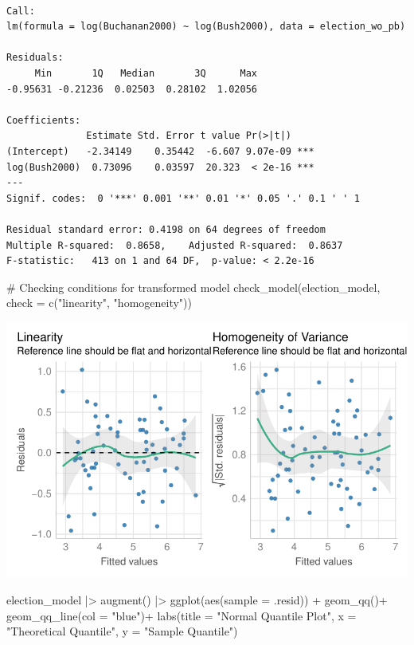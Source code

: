 \documentclass[
  letterpaper,
  DIV=11,
  numbers=noendperiod]{scrartcl}
\newenvironment{Shaded}{\begin{snugshade}}{\end{snugshade}}
\newcommand{\AttributeTok}[1]{\textcolor[rgb]{0.40,0.45,0.13}{#1}}
\newcommand{\CommentTok}[1]{\textcolor[rgb]{0.37,0.37,0.37}{#1}}
\newcommand{\FunctionTok}[1]{\textcolor[rgb]{0.28,0.35,0.67}{#1}}
\newcommand{\NormalTok}[1]{\textcolor[rgb]{0.00,0.23,0.31}{#1}}
\newcommand{\SpecialCharTok}[1]{\textcolor[rgb]{0.37,0.37,0.37}{#1}}
\newcommand{\StringTok}[1]{\textcolor[rgb]{0.13,0.47,0.30}{#1}}
\begin{document}
\begin{verbatim}

Call:
lm(formula = log(Buchanan2000) ~ log(Bush2000), data = election_wo_pb)

Residuals:
     Min       1Q   Median       3Q      Max 
-0.95631 -0.21236  0.02503  0.28102  1.02056 

Coefficients:
              Estimate Std. Error t value Pr(>|t|)    
(Intercept)   -2.34149    0.35442  -6.607 9.07e-09 ***
log(Bush2000)  0.73096    0.03597  20.323  < 2e-16 ***
---
Signif. codes:  0 '***' 0.001 '**' 0.01 '*' 0.05 '.' 0.1 ' ' 1

Residual standard error: 0.4198 on 64 degrees of freedom
Multiple R-squared:  0.8658,    Adjusted R-squared:  0.8637 
F-statistic:   413 on 1 and 64 DF,  p-value: < 2.2e-16
\end{verbatim}

\begin{Shaded}
\begin{Highlighting}[]
\CommentTok{\# Checking conditions for transformed model }
\FunctionTok{check\_model}\NormalTok{(election\_model, }\AttributeTok{check =} \FunctionTok{c}\NormalTok{(}\StringTok{"linearity"}\NormalTok{, }\StringTok{"homogeneity"}\NormalTok{))}
\end{Highlighting}
\end{Shaded}

\includegraphics{case-study-template_files/figure-pdf/unnamed-chunk-6-10.pdf}

\begin{Shaded}
\begin{Highlighting}[]
\NormalTok{election\_model }\SpecialCharTok{|\textgreater{}} \FunctionTok{augment}\NormalTok{() }\SpecialCharTok{|\textgreater{}} \FunctionTok{ggplot}\NormalTok{(}\FunctionTok{aes}\NormalTok{(}\AttributeTok{sample =}\NormalTok{ .resid)) }\SpecialCharTok{+}
  \FunctionTok{geom\_qq}\NormalTok{()}\SpecialCharTok{+} 
  \FunctionTok{geom\_qq\_line}\NormalTok{(}\AttributeTok{col =} \StringTok{"blue"}\NormalTok{)}\SpecialCharTok{+}
  \FunctionTok{labs}\NormalTok{(}\AttributeTok{title =} \StringTok{"Normal Quantile Plot"}\NormalTok{,}
       \AttributeTok{x =} \StringTok{"Theoretical Quantile"}\NormalTok{,}
       \AttributeTok{y =} \StringTok{"Sample Quantile"}\NormalTok{)}
\end{Highlighting}
\end{Shaded}
\end{document}
